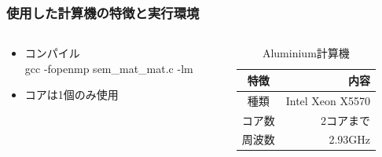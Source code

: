 \documentclass[dvipdfmx]{beamer}
\newcommand{\backupend}{
  \addtocounter{framenumberappendix}{-\value{framenumber}}
  \addtocounter{framenumber}{\value{framenumberappendix}}
}
\begin{document}
\begin{frame}
  \frametitle{使用した計算機の特徴と実行環境}
	\begin{columns}
	\begin{column}{0.48\textwidth}
	\begin{itemize}
			\item コンパイル\\ gcc -fopenmp sem\_mat\_mat.c -lm
			\item コアは1個のみ使用
	\end{itemize}
	\end{column}

	\begin{column}{0.48\textwidth}
  \begin{table}
    \caption{Aluminium計算機}
		\centering
    \begin{tabular}{ c | r } \toprule
			特徴 & 内容\\ \midrule
      種類 & Intel Xeon X5570\\
      コア数 & 2コアまで\\
			周波数 & 2.93GHz\\ \bottomrule
    \end{tabular}
  \end{table}
	\end{column}
	\end{columns}
\end{frame}


\begin{frame}
\end{frame}

\backupend
\end{document}
